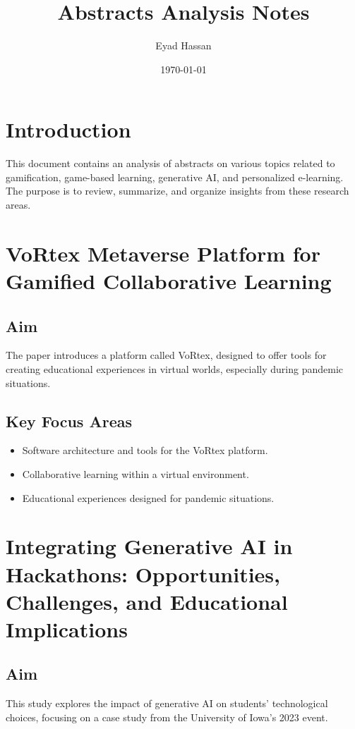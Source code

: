 \documentclass{article}
\title{Abstracts Analysis Notes}
\author{Eyad Hassan}
\date{\today}
\begin{document}
\maketitle

\section{Introduction}
This document contains an analysis of abstracts on various topics related to gamification, game-based learning, generative AI, and personalized e-learning. The purpose is to review, summarize, and organize insights from these research areas.

\newpage


\newpage
\section{VoRtex Metaverse Platform for Gamified Collaborative Learning}

\subsection{Aim}
The paper introduces a platform called VoRtex, designed to offer tools for creating educational experiences in virtual worlds, especially during pandemic situations.

\subsection{Key Focus Areas}
\begin{itemize}
    \item Software architecture and tools for the VoRtex platform.
    \item Collaborative learning within a virtual environment.
    \item Educational experiences designed for pandemic situations.
\end{itemize}

\newpage
\section{Integrating Generative AI in Hackathons: Opportunities, Challenges, and Educational Implications}

\subsection{Aim}
This study explores the impact of generative AI on students' technological choices, focusing on a case study from the University of Iowa's 2023 event.
\end{document}
